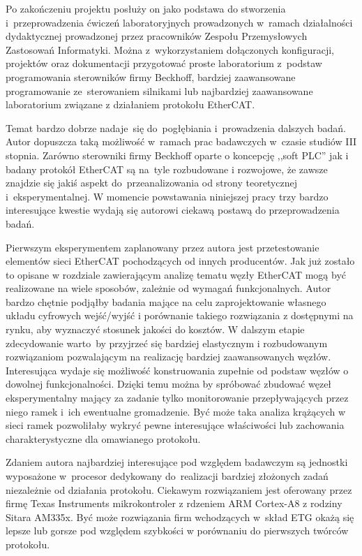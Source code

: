 Po zakończeniu projektu posłuży on jako podstawa do stworzenia i~przeprowadzenia ćwiczeń laboratoryjnych prowadzonych w~ramach działalności dydaktycznej prowadzonej przez pracowników Zespołu Przemysłowych Zastosowań Informatyki. Można z~wykorzystaniem dołączonych konfiguracji, projektów oraz dokumentacji przygotować proste laboratorium z~podstaw programowania sterowników firmy Beckhoff, bardziej zaawansowane programowanie ze~sterowaniem silnikami lub najbardziej zaawansowane laboratorium związane z działaniem protokołu EtherCAT.

Temat bardzo dobrze nadaje~się do~pogłębiania i~prowadzenia dalszych badań. Autor dopuszcza taką możliwość w~ramach prac badawczych w~czasie studiów III stopnia. Zarówno sterowniki firmy Beckhoff oparte o koncepcję ,,soft PLC'' jak i badany protokół EtherCAT są na~tyle rozbudowane i rozwojowe, że zawsze znajdzie się jakiś aspekt do~przeanalizowania od strony teoretycznej i~eksperymentalnej. W momencie powstawania niniejszej pracy trzy bardzo interesujące kwestie wydają się autorowi ciekawą postawą do przeprowadzenia badań.

Pierwszym eksperymentem zaplanowany przez autora jest przetestowanie elementów sieci EtherCAT pochodzących od innych producentów. 
Jak już zostało to opisane w rozdziale zawierającym analizę tematu węzły EtherCAT mogą być realizowane na wiele sposobów, zależnie od wymagań funkcjonalnych. Autor bardzo chętnie podjąłby badania mające na celu zaprojektowanie własnego układu cyfrowych wejść/wyjść i porównanie takiego rozwiązania z dostępnymi na rynku, aby wyznaczyć stosunek jakości do kosztów. W dalszym etapie zdecydowanie warto~by przyjrzeć się bardziej elastycznym i rozbudowanym rozwiązaniom pozwalającym na realizację bardziej zaawansowanych węzłów.
Interesująca wydaje się możliwość konstruowania zupełnie od podstaw węzłów o dowolnej funkcjonalności. Dzięki temu można by spróbować zbudować węzeł eksperymentalny mający za zadanie tylko monitorowanie przepływających przez niego ramek i~ich ewentualne gromadzenie. Być może taka analiza krążących w sieci ramek pozwoliłaby wykryć pewne interesujące właściwości lub zachowania charakterystyczne dla omawianego protokołu.

Zdaniem autora najbardziej interesujące pod względem badawczym są jednostki wyposażone w~procesor dedykowany do~realizacji bardziej złożonych zadań niezależnie od działania protokołu. Ciekawym rozwiązaniem jest oferowany przez firmę Texas Instruments mikrokontroler z rdzeniem ARM Cortex-A8 z rodziny Sitara AM335x. Być może rozwiązania firm wchodzących w~skład ETG okażą się lepsze lub gorsze pod względem szybkości w porównaniu do pierwszych twórców protokołu.


